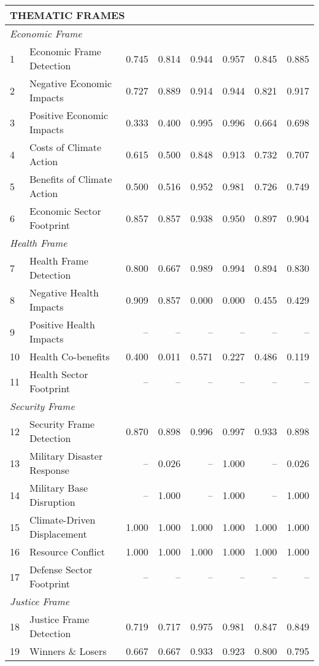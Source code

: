 \documentclass[12pt]{article}
\begin{document}
{\begin{longtable}{p{0.4cm}p{5.5cm}rrrrrr}
\multicolumn{8}{l}{\cellcolor{gray!10}\textbf{THEMATIC FRAMES}} \\
\midrule
\multicolumn{8}{l}{\textit{Economic Frame}} \\
1 & Economic Frame Detection & 0.745 & 0.814 & 0.944 & 0.957 & 0.845 & 0.885 \\
2 & Negative Economic Impacts & 0.727 & 0.889 & 0.914 & 0.944 & 0.821 & 0.917 \\
3 & Positive Economic Impacts & 0.333 & 0.400 & 0.995 & 0.996 & 0.664 & 0.698 \\
4 & Costs of Climate Action & 0.615 & 0.500 & 0.848 & 0.913 & 0.732 & 0.707 \\
5 & Benefits of Climate Action & 0.500 & 0.516 & 0.952 & 0.981 & 0.726 & 0.749 \\
6 & Economic Sector Footprint & 0.857 & 0.857 & 0.938 & 0.950 & 0.897 & 0.904 \\
\multicolumn{8}{l}{\textit{Health Frame}} \\
7 & Health Frame Detection & 0.800 & 0.667 & 0.989 & 0.994 & 0.894 & 0.830 \\
8 & Negative Health Impacts & 0.909 & 0.857 & 0.000 & 0.000 & 0.455 & 0.429 \\
9 & Positive Health Impacts & -- & -- & -- & -- & -- & -- \\
10 & Health Co-benefits & 0.400 & 0.011 & 0.571 & 0.227 & 0.486 & 0.119 \\
11 & Health Sector Footprint & -- & -- & -- & -- & -- & -- \\
\multicolumn{8}{l}{\textit{Security Frame}} \\
12 & Security Frame Detection & 0.870 & 0.898 & 0.996 & 0.997 & 0.933 & 0.898 \\
13 & Military Disaster Response & -- & 0.026 & -- & 1.000 & -- & 0.026 \\
14 & Military Base Disruption & -- & 1.000 & -- & 1.000 & -- & 1.000 \\
15 & Climate-Driven Displacement & 1.000 & 1.000 & 1.000 & 1.000 & 1.000 & 1.000 \\
16 & Resource Conflict & 1.000 & 1.000 & 1.000 & 1.000 & 1.000 & 1.000 \\
17 & Defense Sector Footprint & -- & -- & -- & -- & -- & -- \\
\multicolumn{8}{l}{\textit{Justice Frame}} \\
18 & Justice Frame Detection & 0.719 & 0.717 & 0.975 & 0.981 & 0.847 & 0.849 \\
19 & Winners \& Losers & 0.667 & 0.667 & 0.933 & 0.923 & 0.800 & 0.795 \\

\end{longtable}}
\end{document}
